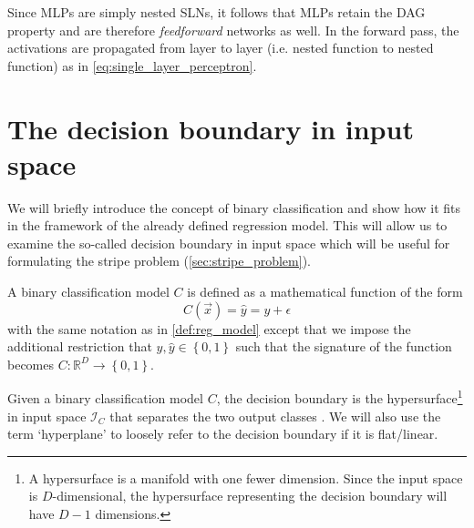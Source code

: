 Since MLPs are simply nested SLNs, it follows that MLPs retain the DAG property and are therefore \textit{feedforward} networks as well.
In the forward pass, the activations are propagated from layer to layer (i.e. nested function to nested function) as in \ref{eq:single_layer_perceptron}.

\section{The decision boundary in input space}
We will briefly introduce the concept of binary classification and show how it fits in the framework of the already defined regression model.
This will allow us to examine the so-called decision boundary in input space which will be useful for formulating the stripe problem (\ref{sec:stripe_problem}).

\begin{definition}
    A binary classification model $C$ is defined as a mathematical function of the form
    \begin{equation}
        C(\vec{x}) = \hat{y} = y + \epsilon
    \end{equation}
    with the same notation as in \ref{def:reg_model} except that we impose the additional restriction that $y,\hat{y}\in \left\{0,1 \right\}$ such that the signature of the function becomes $C:\mathbb{R}^D\rightarrow \left\{0,1\right\}$.
\end{definition}
\begin{definition}
    Given a binary classification model $C$, the decision boundary is the hypersurface\footnote{A hypersurface is a manifold with one fewer dimension. Since the input space is $D$-dimensional, the hypersurface representing the decision boundary will have $D-1$ dimensions.} in input space $\mathcal{I}_C$ that separates the two output classes \cite[p. 723]{russell2010}.
    We will also use the term `hyperplane' to loosely refer to the decision boundary if it is flat/linear.
\end{definition}

